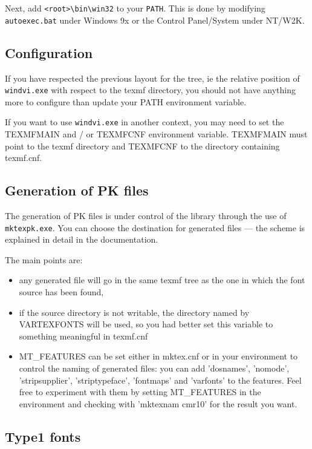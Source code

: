 \documentclass[a4paper,11pt]{article}
\begin{document}
Next, add \verb|<root>\bin\win32| to your \texttt{PATH}. This is
done by modifying \texttt{autoexec.bat} under Windows 9x or the
Control Panel/System under NT/W2K.

\subsection{Configuration}

If you have respected the previous layout for the tree, ie the
relative position of \texttt{windvi.exe} with respect to the texmf
directory, you should not have anything more to configure than update
your PATH environment variable.

If you want to use \texttt{windvi.exe} in another context, you may need to
set the TEXMFMAIN and / or TEXMFCNF environment variable. TEXMFMAIN must
point to the texmf directory and TEXMFCNF to the directory containing
texmf.cnf.

\subsection{Generation of PK files}

The generation of PK files is under control of the \kpathsea{} library
through the use of \texttt{mktexpk.exe}. You can choose the destination for
generated files --- the scheme is explained in detail in the
\kpathsea{} documentation.

The main points are:
\begin{itemize}
\item any generated file will go in the same texmf tree as the one in
which the font source has been found,
\item if the source directory is not writable, the directory named by
VARTEXFONTS will be used, so you had better set this variable to something
meaningful in texmf.cnf
\item MT\_FEATURES can be set either in mktex.cnf or in your environment to
control the naming of generated files: you can add 'dosnames',
'nomode', 'stripsupplier', 'striptypeface', 'fontmaps' and 'varfonts'
to the features. Feel free to experiment with them by setting
MT\_FEATURES in the environment and checking with 'mktexnam cmr10' for
the result you want.
\end{itemize}

\subsection{Type1 fonts}
\end{document}
